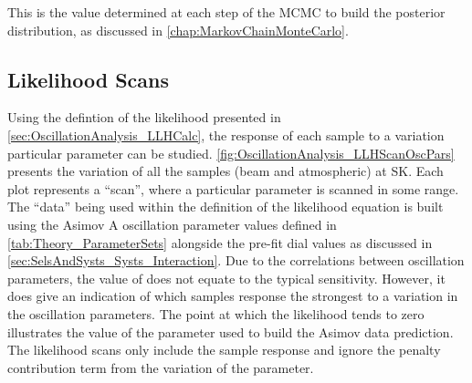 This is the value determined at each step of the MCMC to build the posterior distribution, as discussed in \autoref{chap:MarkovChainMonteCarlo}.

\clearpage
\subsection{Likelihood Scans}
\label{sec:OscillationAnalysis_LLHScans}

Using the defintion of the likelihood presented in \autoref{sec:OscillationAnalysis_LLHCalc}, the response of each sample to a variation particular parameter can be studied. \autoref{fig:OscillationAnalysis_LLHScanOscPars} presents the variation of all the samples (beam and atmospheric) at SK. Each plot represents a ``scan'', where a particular parameter is scanned in some range. The ``data'' being used within the definition of the likelihood equation is built using the Asimov A oscillation parameter values defined in \autoref{tab:Theory_ParameterSets} alongside the pre-fit dial values as discussed in \autoref{sec:SelsAndSysts_Systs_Interaction}. Due to the correlations between oscillation parameters, the value of  does not equate to the typical \quickmath{1\sigma} sensitivity. However, it does give an indication of which samples response the strongest to a variation in the oscillation parameters. The point at which the likelihood tends to zero illustrates the value of the parameter used to build the Asimov data prediction. The likelihood scans only include the sample response and ignore the penalty contribution term from the variation of the parameter.

